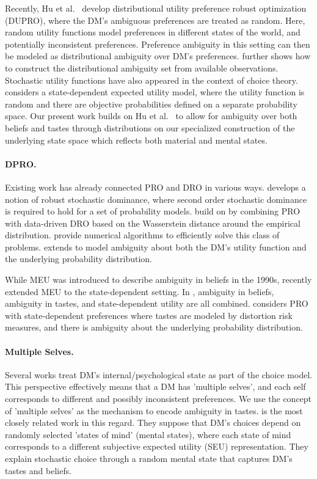 \documentclass[11pt,oneside]{article}
\theoremstyle{plain}
\theoremstyle{plain}
\theoremstyle{plain}
\theoremstyle{plain}
\theoremstyle{plain}
\theoremstyle{definition}
\theoremstyle{definition}
\theoremstyle{remark}
\theoremstyle{plain}
\begin{document}
Recently, Hu et al.~\cite{hu2024distributional} develop distributional utility preference robust optimization (DUPRO), where the DM's ambiguous preferences are treated as random.
Here, random utility functions model preferences in different states of the world, and potentially inconsistent preferences. 
Preference ambiguity in this setting can then be modeled as distributional ambiguity over DM's preferences.
\cite{hu2024distributional} further shows how to construct the distributional ambiguity set from available observations.
Stochastic utility functions have also appeared in the context of choice theory. \cite{jarrow2021concavity} considers a state-dependent expected utility model, where the utility function is random and there are objective probabilities defined on a separate probability space.
Our present work builds on Hu et al.~\cite{hu2024distributional} to allow for ambiguity over both beliefs and tastes through distributions on our specialized construction of the underlying state space which reflects both material and mental states.

\paragraph{DPRO.}
Existing work has already connected PRO and DRO in various ways. \cite{dentcheva2010} develops a notion of robust stochastic dominance, where second order stochastic dominance is required to hold for a set of probability models.
\cite{peng2022data} build on \cite{dentcheva2010} by combining PRO with data-driven DRO based on the Wasserstein distance around the empirical distribution. \cite{peng2022data} provide numerical algorithms to efficiently solve this class of problems.
\cite{haskell2016ambiguity} extends \cite{armbruster2015decision} to model ambiguity about both the DM's utility function and the underlying probability distribution.

While MEU was introduced to describe ambiguity in beliefs in the 1990s, \cite{hill2019non} recently extended MEU to the state-dependent setting. In \cite{hill2019non}, ambiguity in beliefs, ambiguity in tastes, and state-dependent utility are all combined.
\cite{wang2023preference_state} considers PRO with state-dependent preferences where tastes are modeled by distortion risk measures, and there is ambiguity about the underlying probability distribution.

\paragraph{Multiple Selves.}
Several works treat DM's internal/psychological state as part of the choice model. This perspective effectively means that a DM has 'multiple selves', and each self corresponds to different and possibly inconsistent preferences.
We use the concept of 'multiple selves' as the mechanism to encode ambiguity in tastes.
\cite{karni2016theory} is the most closely related work in this regard. They suppose that DM's choices depend on randomly selected 'states of mind' (mental states), where each state of mind corresponds to a different subjective expected utility (SEU) representation.
They explain stochastic choice through a random mental state that captures DM's tastes and beliefs.
\end{document}
